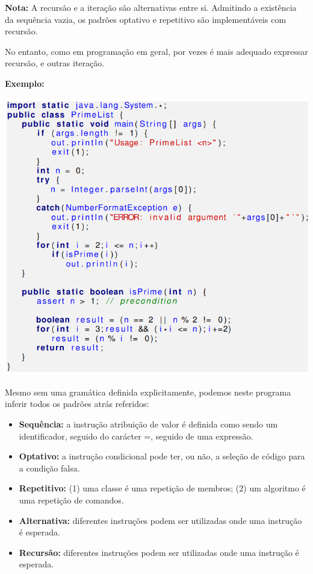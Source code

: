 \documentclass{article}
\begin{document}
\begin{flushleft}
  \item \textbf{Nota:} A recursão e a iteração são alternativas
  entre si. Admitindo a existência da sequência vazia, os
  padrões optativo e repetitivo são implementáveis com
  recursão.
  \item No entanto, como em programação em geral, por vezes é
  mais adequado expressar recursão, e outras iteração.
\end{flushleft}

\begin{flushleft}
  \textbf{Exemplo:}

  \begin{center}
    \includegraphics[scale=0.35]{34}
  \end{center}
\end{flushleft}

\pagebreak

\begin{flushleft}
  \item Mesmo sem uma gramática definida explicitamente,
  podemos neste programa inferir todos os padrões atrás
  referidos:
  \begin{itemize}
    \item \textbf{Sequência:} a instrução atribuição de valor é definida como
    sendo um identificador, seguido do carácter =, seguido de
    uma expressão.
    \item \textbf{Optativo:} a instrução condicional pode ter, ou não, a
    seleção de código para a condição falsa.
    \item \textbf{Repetitivo:} (1) uma classe é uma repetição de membros;
    (2) um algoritmo é uma repetição de comandos.
    \item \textbf{Alternativa:} diferentes instruções podem ser utilizadas onde
    uma instrução é esperada.
    \item \textbf{Recursão:} diferentes instruções podem ser utilizadas onde
    uma instrução é esperada.
  \end{itemize}
\end{flushleft}
\end{document}
